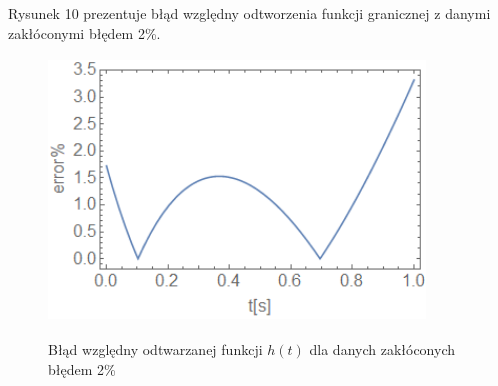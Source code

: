 \documentclass[twoside]{projektInzynierskiMS1}
\newcounter{rowcnt}
\newcommand\rownum{\ifnumequal{\value{rowcnt}}{0}{\textbf{Nr.}}{\therowcnt.}\refstepcounter{rowcnt}}
\begin{document}
Rysunek 10 prezentuje błąd względny odtworzenia funkcji granicznej z danymi zakłóconymi błędem 2\%. \\

\begin{figure}[H]
\begin{center}
		\includegraphics[height=7cm, width=10cm]{pics/2abs.png}\\
	\caption{Błąd względny odtwarzanej funkcji $h(t)$ dla danych zakłóconych błędem 2\%}
\end{center}
\end{figure}




\end{document}

